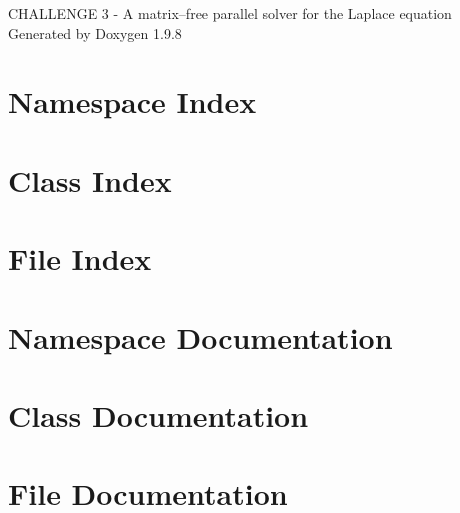 \documentclass[twoside]{book}
\newcommand{\+}{\discretionary{\mbox{\scriptsize$\hookleftarrow$}}{}{}}
\newcommand{\clearemptydoublepage}{%
    \newpage{\pagestyle{empty}\cleardoublepage}%
  }
\begin{document}
  \raggedbottom
    \hypersetup{pageanchor=false,
                bookmarksnumbered=true,
                pdfencoding=unicode
               }
  \begin{titlepage}
  \vspace*{7cm}
  \begin{center}%
  {\Large CHALLENGE 3 -\/ A matrix–free parallel solver for the Laplace equation}\\
  \vspace*{1cm}
  {\large Generated by Doxygen 1.9.8}\\
  \end{center}
  \end{titlepage}
  \clearemptydoublepage
  \tableofcontents
  \clearemptydoublepage
  \hypersetup{pageanchor=true}


\chapter{Namespace Index}

\chapter{Class Index}

\chapter{File Index}

\chapter{Namespace Documentation}


\chapter{Class Documentation}


\chapter{File Documentation}







  \backmatter
  \newpage
  \clearemptydoublepage
  \printindex
\end{document}
